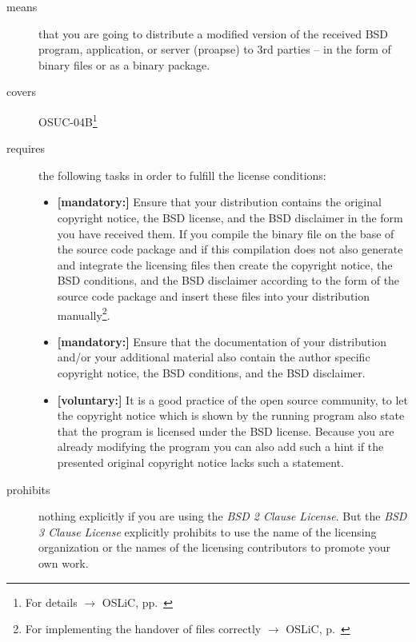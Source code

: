 \begin{description}
\item[means] that you are going to distribute a modified version of the received
BSD pro\-gram, application, or server (proapse) to 3rd parties -- in the form of
binary files or as a binary package.
\item[covers] OSUC-04B\footnote{For details $\rightarrow$ OSLiC, pp.\ \pageref{OSUC-04B-DEF}}
\item[requires] the following tasks in order to fulfill the license conditions:
\begin{itemize}

  \item  \textbf{[mandatory:]} Ensure that your distribution contains the
  original copyright notice, the BSD license, and the BSD disclaimer in the form
  you have received them. If you compile the binary file on the base of the
  source code package and if this compilation does not also generate and
  integrate the licensing files then create the copyright notice, the BSD
  conditions, and the BSD disclaimer according to the form of the source code
  package and insert these files into your distribution manually\footnote{For
  implementing the handover of files correctly $\rightarrow$ OSLiC, p.\ 
  \pageref{DistributingFilesHint}}.

  \item  \textbf{[mandatory:]} Ensure that the documentation of your
  distribution and/or your additional material also contain the author specific
  copyright notice, the BSD conditions, and the BSD disclaimer.
  
  \item \textbf{[voluntary:]} It is a good practice of the open source
  community, to let the copyright notice which is shown by the running program
  also state that the program is licensed under the BSD license. Because you are
  already modifying the program you can also add such a hint if the presented
  original copyright notice lacks such a statement.
\end{itemize}

\item[prohibits] nothing explicitly if you are using the \emph{BSD 2 Clause
License}. But the \emph{BSD 3 Clause License} explicitly prohibits to use the
name of the licensing organization or the names of the licensing contributors to
promote your own work.

\end{description}


